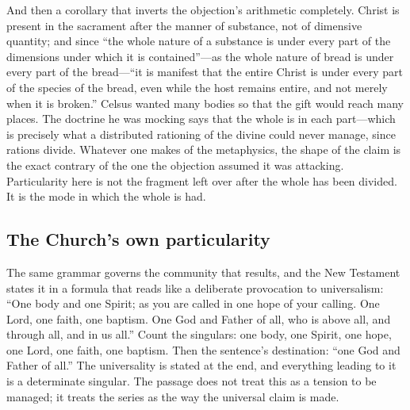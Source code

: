 And then a corollary that inverts the objection's arithmetic completely. Christ is present in the sacrament after the manner of substance, not of dimensive quantity; and since ``the whole nature of a substance is under every part of the dimensions under which it is contained''---as the whole nature of bread is under every part of the bread---``it is manifest that the entire Christ is under every part of the species of the bread, even while the host remains entire, and not merely when it is broken.'' Celsus wanted many bodies so that the gift would reach many places. The doctrine he was mocking says that the whole is in each part---which is precisely what a distributed rationing of the divine could never manage, since rations divide. Whatever one makes of the metaphysics, the shape of the claim is the exact contrary of the one the objection assumed it was attacking. Particularity here is not the fragment left over after the whole has been divided. It is the mode in which the whole is had.

\subsection{The Church's own particularity}

The same grammar governs the community that results, and the New Testament states it in a formula that reads like a deliberate provocation to universalism: ``One body and one Spirit; as you are called in one hope of your calling. One Lord, one faith, one baptism. One God and Father of all, who is above all, and through all, and in us all.'' Count the singulars: one body, one Spirit, one hope, one Lord, one faith, one baptism. Then the sentence's destination: ``one God and Father of all.'' The universality is stated at the end, and everything leading to it is a determinate singular. The passage does not treat this as a tension to be managed; it treats the series as the way the universal claim is made.

